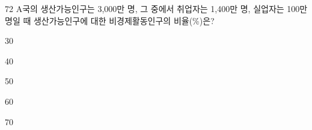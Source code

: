 \begin{question}{72}
A국의 생산가능인구는 3,000만 명, 그 중에서 취업자는 1,400만 명, 실업자는 100만 명일 때 생산가능인구에 대한 비경제활동인구의 비율(\%)은?
\begin{choices}
  \item 30
  \item 40
  \item 50
  \item 60
  \item 70
\end{choices}
\end{question}
